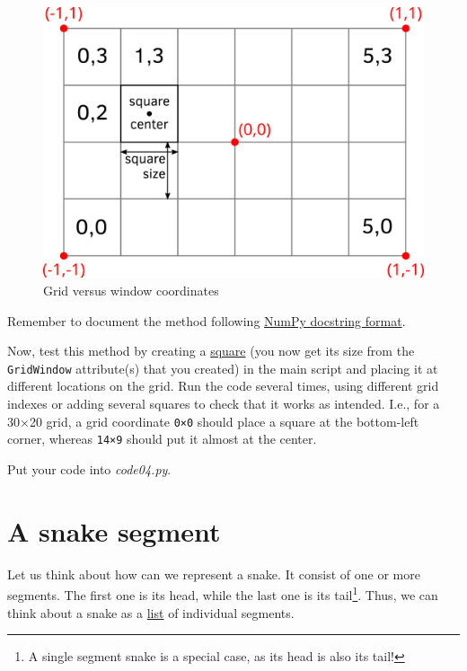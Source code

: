 \documentclass[
]{book}
\begin{document}
\begin{figure}
\includegraphics[width=16.49in]{images/snake-grid} \caption{Grid versus window coordinates}\label{fig:unnamed-chunk-2}
\end{figure}

Remember to document the method following \href{https://numpydoc.readthedocs.io/en/latest/format.html}{NumPy docstring format}.

Now, test this method by creating a \href{https://psychopy.org/api/visual/rect.html\#psychopy.visual.rect.Rect}{square} (you now get its size from the \texttt{GridWindow} attribute(s) that you created) in the main script and placing it at different locations on the grid. Run the code several times, using different grid indexes or adding several squares to check that it works as intended. I.e., for a 30×20 grid, a grid coordinate \texttt{0×0} should place a square at the bottom-left corner, whereas \texttt{14×9} should put it almost at the center.

Put your code into \emph{code04.py}.

\hypertarget{a-snake-segment}{%
\section{A snake segment}\label{a-snake-segment}}

Let us think about how can we represent a snake. It consist of one or more segments. The first one is its head, while the last one is its tail\footnote{A single segment snake is a special case, as its head is also its tail!}. Thus, we can think about a snake as a \href{https://docs.python.org/3/tutorial/datastructures.html\#more-on-lists}{list} of individual segments.
\end{document}
